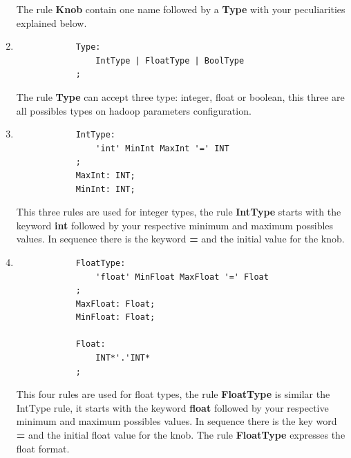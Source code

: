 \begin{enumerate}
		The rule \textbf{Knob} contain one name followed by a \textbf{Type} with
		your peculiarities explained below.

	\item
		\singlespacing
		\begin{listing}[H]
		\begin{verbatim}
			Type:
				IntType | FloatType | BoolType
			;
		\end{verbatim}
		\label{listing:modelRule}
		\end{listing}

		The rule \textbf{Type} can accept three type: integer, float or boolean,
		this three are all possibles types on hadoop parameters configuration.

	\item
		\singlespacing
		\begin{listing}[H]
		\begin{verbatim}
			IntType:
				'int' MinInt MaxInt '=' INT
			;
			MaxInt: INT;
			MinInt: INT;
		\end{verbatim}
		\label{listing:modelRule}
		\end{listing}

		This three rules are used for integer types, the rule \textbf{IntType}
		starts with the keyword {\bf int} followed by your respective minimum
		and maximum possibles values. In sequence there is the keyword {\bf =}
		and the initial value for the knob.

	\item
		\singlespacing
		\begin{listing}[H]
		\begin{verbatim}
			FloatType:
				'float' MinFloat MaxFloat '=' Float
			;
			MaxFloat: Float;
			MinFloat: Float;

			Float:
				INT*'.'INT*
			;
		\end{verbatim}
		\label{listing:modelRule}
		\end{listing}

		This four rules are used for float types, the rule \textbf{FloatType} is
		similar the IntType rule, it starts with the keyword {\bf float} followed
		by your respective minimum and maximum possibles values. In sequence there
		is the key word {\bf =}	and the initial float value for the knob. The rule
		{\bf FloatType} expresses the float format.


\end{enumerate}
